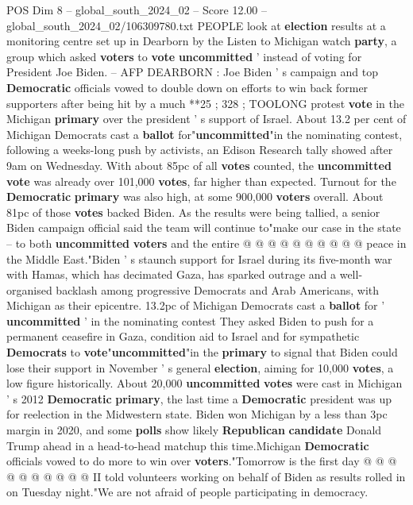 \begin{textsample}{POS Dim 8 – global\_south\_2024\_02 – Score 12.00 – global\_south\_2024\_02/106309780.txt}  \label{ex:f8_pos_199}
PEOPLE look at \textbf{election} results at a monitoring centre set up in Dearborn by the Listen to Michigan watch \textbf{party}, a group which asked \textbf{voters} to \textbf{vote} \textbf{uncommitted} ' instead of voting for President Joe Biden. -- AFP DEARBORN : Joe Biden ' s campaign and top \textbf{Democratic} officials vowed to double down on efforts to win back former supporters after being hit by a much **25 ; 328 ; TOOLONG protest \textbf{vote} in the Michigan \textbf{primary} over the president ' s support of Israel.
About 13.2 per cent of Michigan Democrats cast a \textbf{ballot} for"\textbf{uncommitted}"in the nominating contest, following a weeks-long push by activists, an Edison Research tally showed after 9am on Wednesday.
With about 85pc of all \textbf{votes} counted, the \textbf{uncommitted} \textbf{vote} was already over 101,000 \textbf{votes}, far higher than expected.
Turnout for the \textbf{Democratic} \textbf{primary} was also high, at some 900,000 \textbf{voters} overall.
About 81pc of those \textbf{votes} backed Biden.
As the results were being tallied, a senior Biden campaign official said the team will continue to"make our case in the state -- to both \textbf{uncommitted} \textbf{voters} and the entire @ @ @ @ @ @ @ @ @ @ peace in the Middle East."Biden ' s staunch support for Israel during its five-month war with Hamas, which has decimated Gaza, has sparked outrage and a well-organised backlash among progressive Democrats and Arab Americans, with Michigan as their epicentre. 13.2pc of Michigan Democrats cast a \textbf{ballot} for ' \textbf{uncommitted} ' in the nominating contest They asked Biden to push for a permanent ceasefire in Gaza, condition aid to Israel and for sympathetic \textbf{Democrats} to \textbf{vote}"\textbf{uncommitted}"in the \textbf{primary} to signal that Biden could lose their support in November ' s general \textbf{election}, aiming for 10,000 \textbf{votes}, a low figure historically.
About 20,000 \textbf{uncommitted} \textbf{votes} were cast in Michigan ' s 2012 \textbf{Democratic} \textbf{primary}, the last time a \textbf{Democratic} president was up for reelection in the Midwestern state.
Biden won Michigan by a less than 3pc margin in 2020, and some \textbf{polls} show likely \textbf{Republican} \textbf{candidate} Donald Trump ahead in a head-to-head matchup this time.Michigan \textbf{Democratic} officials vowed to do more to win over \textbf{voters}."Tomorrow is the first day @ @ @ @ @ @ @ @ @ @ II told volunteers working on behalf of Biden as results rolled in on Tuesday night."We are not afraid of people participating in democracy.

\end{textsample}
